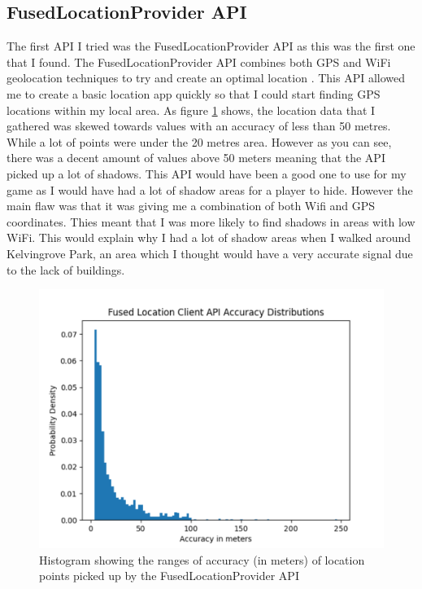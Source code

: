 \documentclass{l4proj}
\begin{document}
\subsection{FusedLocationProvider API}
\label{fusedProvider}
The first API I tried was the FusedLocationProvider API as this was the first one that I found. The FusedLocationProvider API combines both GPS and WiFi geolocation
techniques to try and create an optimal location \citep{fused}. This API allowed me to create a basic location app quickly so that I could start finding GPS locations
within my local area. As figure \ref{fig:fusedhist} shows, the location data that I gathered was skewed towards values with an accuracy of less than 50 metres. While a lot of
points were under the 20 metres area. However as you can see, there was a decent amount of values above 50 meters meaning that the API picked up a lot of shadows.
This API would have been a good one to use for my game as I would have had a lot of shadow areas for a player to hide. However the main flaw was that
it was giving me a combination of both Wifi and GPS coordinates. Thies meant that I was more likely to find shadows in areas with low WiFi. This would
explain why I had a lot of shadow areas when I walked around Kelvingrove Park, an area which I thought would have a very accurate signal due to the lack of buildings.

\begin{figure}
    \centering
    \includegraphics[width=0.6\linewidth]{images/fused_histogram.pdf}    

    \caption{Histogram showing the ranges of accuracy (in meters) of location points picked up by the FusedLocationProvider API}

    \label{fig:fusedhist} 
\end{figure}
\end{document}
